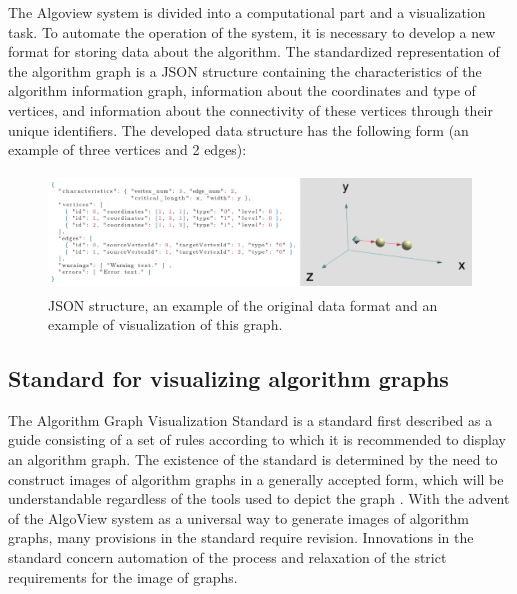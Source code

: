 The Algoview system is divided into a computational part and a visualization task. To automate the operation of the system, it is necessary to develop a new format for storing data about the algorithm. The standardized representation of the algorithm graph is a JSON structure containing the characteristics of the algorithm information graph, information about the coordinates and type of vertices, and information about the connectivity of these vertices through their unique identifiers. The developed data structure has the following form (an example of three vertices and 2 edges):

\begin{figure}
\centering
\includegraphics[height=3.1cm]{assets/json_example.png}
\caption{JSON structure, an example of the original data format and an example of visualization of this graph.}
\end{figure}

\subsection{Standard for visualizing algorithm graphs}

The Algorithm Graph Visualization Standard is a standard first described as a guide consisting of a set of rules according to which it is recommended to display an algorithm graph. The existence of the standard is determined by the need to construct images of algorithm graphs in a generally accepted form, which will be understandable regardless of the tools used to depict the graph \cite{m5}. With the advent of the AlgoView system as a universal way to generate images of algorithm graphs, many provisions in the standard require revision. Innovations in the standard concern automation of the process and relaxation of the strict requirements for the image of graphs.